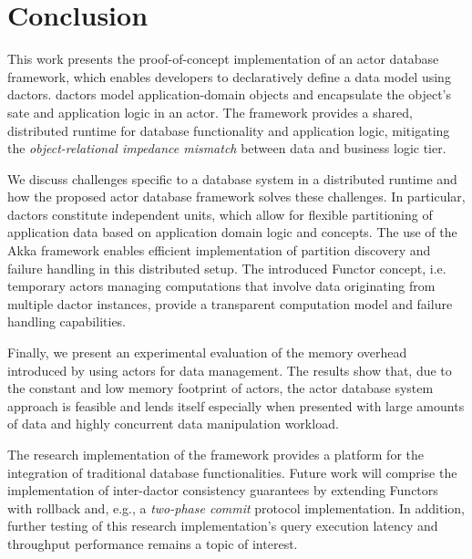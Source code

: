 
\section{Conclusion}\label{sec:conclusion}

This work presents the proof-of-concept implementation of an actor database framework, which enables developers to declaratively define a data model using \glspl{dactor}.
\Glspl{dactor} model application-domain objects and encapsulate the object's sate and application logic in an actor.
The framework provides a shared, distributed runtime for database functionality and application logic, mitigating the \textit{object-relational impedance mismatch} between data and business logic tier.

We discuss challenges specific to a database system in a distributed runtime and how the proposed actor database framework solves these challenges.
In particular, \glspl{dactor} constitute independent units, which allow for flexible partitioning of application data based on application domain logic and concepts.
The use of the Akka framework enables efficient implementation of partition discovery and failure handling in this distributed setup.
The introduced Functor concept, i.e. temporary actors managing computations that involve data originating from multiple \gls{dactor} instances, provide a transparent computation model and failure handling capabilities.

Finally, we present an experimental evaluation of the memory overhead introduced by using actors for data management.
The results show that, due to the constant and low memory footprint of actors, the actor database system approach is feasible and lends itself especially when presented with large amounts of data and highly concurrent data manipulation workload.

The research implementation of the framework provides a platform for the integration of traditional database functionalities.
Future work will comprise the implementation of inter-\gls{dactor} consistency guarantees by extending Functors with rollback and, e.g., a \textit{two-phase commit} protocol implementation.
In addition, further testing of this research implementation's query execution latency and throughput performance remains a topic of interest.